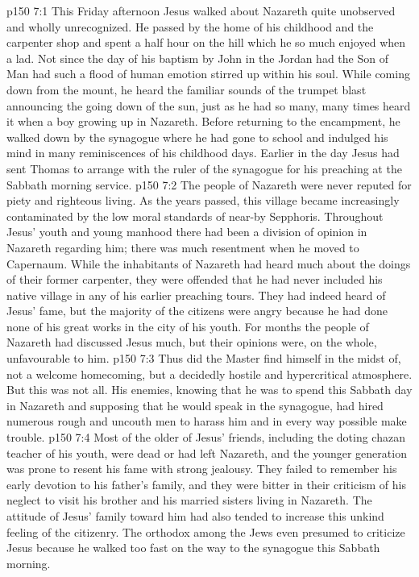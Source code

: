 \vs p150 7:1 This Friday afternoon Jesus walked about Nazareth quite unobserved and wholly unrecognized. He passed by the home of his childhood and the carpenter shop and spent a half hour on the hill which he so much enjoyed when a lad. Not since the day of his baptism by John in the Jordan had the Son of Man had such a flood of human emotion stirred up within his soul. While coming down from the mount, he heard the familiar sounds of the trumpet blast announcing the going down of the sun, just as he had so many, many times heard it when a boy growing up in Nazareth. Before returning to the encampment, he walked down by the synagogue where he had gone to school and indulged his mind in many reminiscences of his childhood days. Earlier in the day Jesus had sent Thomas to arrange with the ruler of the synagogue for his preaching at the Sabbath morning service.
\vs p150 7:2 The people of Nazareth were never reputed for piety and righteous living. As the years passed, this village became increasingly contaminated by the low moral standards of near\hyp{}by Sepphoris. Throughout Jesus’ youth and young manhood there had been a division of opinion in Nazareth regarding him; there was much resentment when he moved to Capernaum. While the inhabitants of Nazareth had heard much about the doings of their former carpenter, they were offended that he had never included his native village in any of his earlier preaching tours. They had indeed heard of Jesus’ fame, but the majority of the citizens were angry because he had done none of his great works in the city of his youth. For months the people of Nazareth had discussed Jesus much, but their opinions were, on the whole, unfavourable to him.
\vs p150 7:3 Thus did the Master find himself in the midst of, not a welcome homecoming, but a decidedly hostile and hypercritical atmosphere. But this was not all. His enemies, knowing that he was to spend this Sabbath day in Nazareth and supposing that he would speak in the synagogue, had hired numerous rough and uncouth men to harass him and in every way possible make trouble.
\vs p150 7:4 Most of the older of Jesus’ friends, including the doting chazan teacher of his youth, were dead or had left Nazareth, and the younger generation was prone to resent his fame with strong jealousy. They failed to remember his early devotion to his father’s family, and they were bitter in their criticism of his neglect to visit his brother and his married sisters living in Nazareth. The attitude of Jesus’ family toward him had also tended to increase this unkind feeling of the citizenry. The orthodox among the Jews even presumed to criticize Jesus because he walked too fast on the way to the synagogue this Sabbath morning.
